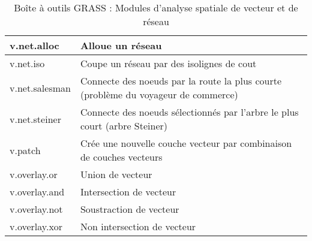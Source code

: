 \begin{table}[H]
\begin{tabular}{|p{4cm}|p{10cm}|}
  \hline v.net.alloc & Alloue un réseau\\
  \hline v.net.iso & Coupe un réseau par des isolignes de cout\\
  \hline v.net.salesman & Connecte des noeuds par la route la plus courte (problème du voyageur de commerce) \\
  \hline v.net.steiner & Connecte des noeuds sélectionnés par l'arbre le plus court (arbre Steiner) \\
  \hline v.patch & Crée une nouvelle couche vecteur par combinaison de couches vecteurs\\
  \hline v.overlay.or & Union de vecteur\\
  \hline v.overlay.and & Intersection de vecteur\\
  \hline v.overlay.not & Soustraction de vecteur \\
  \hline v.overlay.xor & Non intersection de vecteur\\
\hline
\end{tabular}
\caption{Boîte à outils GRASS : Modules d'analyse spatiale de vecteur et de réseau}
\end{table}

\vspace{-0.5cm}

